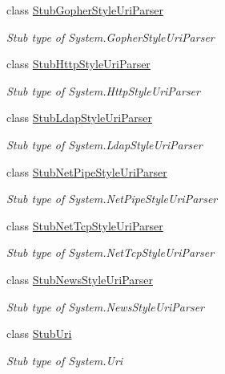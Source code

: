 \begin{DoxyCompactItemize}
class \hyperlink{class_system_1_1_fakes_1_1_stub_gopher_style_uri_parser}{Stub\-Gopher\-Style\-Uri\-Parser}
\begin{DoxyCompactList}\small\item\em Stub type of System.\-Gopher\-Style\-Uri\-Parser\end{DoxyCompactList}\item 
class \hyperlink{class_system_1_1_fakes_1_1_stub_http_style_uri_parser}{Stub\-Http\-Style\-Uri\-Parser}
\begin{DoxyCompactList}\small\item\em Stub type of System.\-Http\-Style\-Uri\-Parser\end{DoxyCompactList}\item 
class \hyperlink{class_system_1_1_fakes_1_1_stub_ldap_style_uri_parser}{Stub\-Ldap\-Style\-Uri\-Parser}
\begin{DoxyCompactList}\small\item\em Stub type of System.\-Ldap\-Style\-Uri\-Parser\end{DoxyCompactList}\item 
class \hyperlink{class_system_1_1_fakes_1_1_stub_net_pipe_style_uri_parser}{Stub\-Net\-Pipe\-Style\-Uri\-Parser}
\begin{DoxyCompactList}\small\item\em Stub type of System.\-Net\-Pipe\-Style\-Uri\-Parser\end{DoxyCompactList}\item 
class \hyperlink{class_system_1_1_fakes_1_1_stub_net_tcp_style_uri_parser}{Stub\-Net\-Tcp\-Style\-Uri\-Parser}
\begin{DoxyCompactList}\small\item\em Stub type of System.\-Net\-Tcp\-Style\-Uri\-Parser\end{DoxyCompactList}\item 
class \hyperlink{class_system_1_1_fakes_1_1_stub_news_style_uri_parser}{Stub\-News\-Style\-Uri\-Parser}
\begin{DoxyCompactList}\small\item\em Stub type of System.\-News\-Style\-Uri\-Parser\end{DoxyCompactList}\item 
class \hyperlink{class_system_1_1_fakes_1_1_stub_uri}{Stub\-Uri}
\begin{DoxyCompactList}\small\item\em Stub type of System.\-Uri\end{DoxyCompactList}\item 

\end{DoxyCompactItemize}
